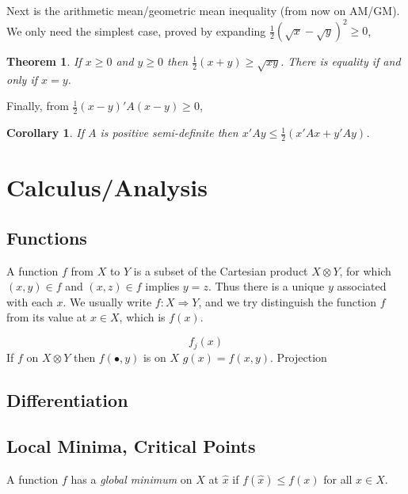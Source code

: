 \documentclass[
  12pt,
]{book}
\newtheorem{theorem}{Theorem}[chapter]
\newtheorem{corollary}{Corollary}[chapter]
\theoremstyle{definition}
\theoremstyle{definition}
\theoremstyle{definition}
\theoremstyle{definition}
\theoremstyle{remark}
\begin{document}
Next is the arithmetic mean/geometric mean inequality (from now on AM/GM). We only need the simplest case, proved by expanding \(\frac12(\sqrt{x}-\sqrt{y})^2\geq 0\),

\begin{theorem}
\protect\hypertarget{thm:mathaddamgm}{}{\label{thm:mathaddamgm} }If \(x\geq 0\) and \(y\geq 0\) then \(\frac12(x+y)\geq\sqrt{xy}\). There is equality if and only if \(x=y\).
\end{theorem}

Finally, from \(\frac12(x-y)'A(x-y)\geq 0\),

\begin{corollary}
\protect\hypertarget{cor:mathaddamcor}{}{\label{cor:mathaddamcor} }If \(A\) is positive semi-definite then \(x'Ay\leq\frac12(x'Ax+y'Ay)\).
\end{corollary}

\hypertarget{apanal}{%
\section{Calculus/Analysis}\label{apanal}}

\hypertarget{appfunctions}{%
\subsection{Functions}\label{appfunctions}}

A function \(f\) from \(X\) to \(Y\) is a subset of the Cartesian product \(X\otimes Y\),
for which \((x,y)\in f\) and \((x,z)\in f\) implies \(y=z\). Thus there is a unique
\(y\) associated with each \(x\). We usually write \(f:X\Rightarrow Y\), and we try
distinguish the function \(f\) from its value at \(x\in X\), which is \(f(x)\).

\[
f_j(x)
\]
If \(f\) on \(X\otimes Y\) then \(f(\bullet,y)\) is on \(X\) \(g(x)=f(x,y)\). Projection

\hypertarget{appdiffer}{%
\subsection{Differentiation}\label{appdiffer}}

\hypertarget{local-minima-critical-points}{%
\subsection{Local Minima, Critical Points}\label{local-minima-critical-points}}

A function \(f\) has a \emph{global minimum} on \(X\) at \(\hat x\) if \(f(\hat x)\leq f(x)\) for all \(x\in X\).
\end{document}
